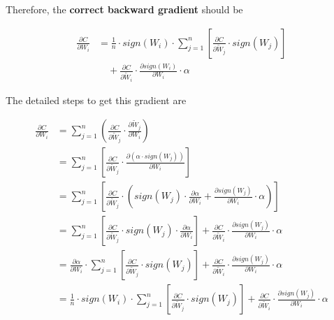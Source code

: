 \documentclass[12pt]{article} %
\begin{document}
Therefore, the \textbf{correct backward gradient} should be

\begin{equation}
\begin{aligned}
	\frac{\partial C}{\partial W_{i}} &= 
	\frac{1}{n} \cdot sign(W_{i}) \cdot 
	\sum_{j=1}^{n}[\frac{\partial C}{\partial \widetilde{W}_j} \cdot sign(W_j)]\\
	&\quad +
	\frac{\partial C}{\partial \widetilde{W}_i} \cdot
	\frac{\partial sign(W_i)}{\partial W_i} \cdot \alpha
\end{aligned}
\end{equation}

The detailed steps to get this gradient are

\begin{equation}
\begin{aligned}
	\frac{\partial C}{\partial W_{i}}
	&= 
	\sum_{j=1}^{n} (\frac{\partial C}{\partial \widetilde{W}_j}\cdot
	\frac{\partial \widetilde{W}_j}{\partial W_i}) 
	\\ &=
	\sum_{j=1}^{n} [\frac{\partial C}{\partial \widetilde{W}_j}\cdot
	\frac{\partial (\alpha \cdot sign(W_j))}{\partial W_i}] 
	\\ &=
	\sum_{j=1}^{n} [\frac{\partial C}{\partial \widetilde{W}_j}\cdot
	(sign(W_j)\cdot\frac{\partial \alpha}{\partial W_i} + 
	\frac{\partial sign(W_j)}{\partial W_i}\cdot\alpha)]
	\\ &=
	\sum_{j=1}^{n} [\frac{\partial C}{\partial \widetilde{W}_j}\cdot
	sign(W_j)\cdot\frac{\partial \alpha}{\partial W_i}] + 
	\frac{\partial C}{\partial \widetilde{W}_i} \cdot
	\frac{\partial sign(W_j)}{\partial W_i}\cdot\alpha
	\\ &=
	\frac{\partial \alpha}{\partial W_i}\cdot
	\sum_{j=1}^{n} [\frac{\partial C}{\partial \widetilde{W}_j}\cdot
	sign(W_j)] + 
	\frac{\partial C}{\partial \widetilde{W}_i} \cdot
	\frac{\partial sign(W_j)}{\partial W_i}\cdot\alpha
	\\ &=
	\frac{1}{n}\cdot sign(W_i) \cdot
	\sum_{j=1}^{n} [\frac{\partial C}{\partial \widetilde{W}_j}\cdot
	sign(W_j)] + 
	\frac{\partial C}{\partial \widetilde{W}_i} \cdot
	\frac{\partial sign(W_j)}{\partial W_i}\cdot\alpha
\end{aligned}
\end{equation}
\end{document}
